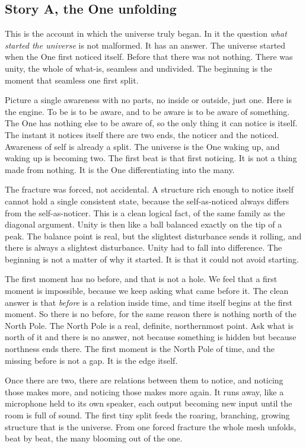 \subsection{Story A, the One unfolding}

This is the account in which the universe truly began. In it the question \emph{what started the universe} is not
malformed. It has an answer. The universe started when the One first noticed itself. Before that there was not
nothing. There was unity, the whole of what-is, seamless and undivided. The beginning is the moment that seamless
one first split.

Picture a single awareness with no parts, no inside or outside, just one. Here is the engine. To be is to be
aware, and to be aware is to be aware of something. The One has nothing else to be aware of, so the only thing it
can notice is itself. The instant it notices itself there are two ends, the noticer and the noticed. Awareness of
self is already a split. The universe is the One waking up, and waking up is becoming two. The first beat is that
first noticing. It is not a thing made from nothing. It is the One differentiating into the many.

The fracture was forced, not accidental. A structure rich enough to notice itself cannot hold a single consistent
state, because the self-as-noticed always differs from the self-as-noticer. This is a clean logical fact, of the
same family as the diagonal argument. Unity is then like a ball balanced exactly on the tip of a peak. The balance
point is real, but the slightest disturbance sends it rolling, and there is always a slightest disturbance. Unity
had to fall into difference. The beginning is not a matter of why it started. It is that it could not avoid
starting.

The first moment has no before, and that is not a hole. We feel that a first moment is impossible, because we keep
asking what came before it. The clean answer is that \emph{before} is a relation inside time, and time itself
begins at the first moment. So there is no before, for the same reason there is nothing north of the North Pole.
The North Pole is a real, definite, northernmost point. Ask what is north of it and there is no answer, not
because something is hidden but because northness ends there. The first moment is the North Pole of time, and the
missing before is not a gap. It is the edge itself.

Once there are two, there are relations between them to notice, and noticing those makes more, and noticing those
makes more again. It runs away, like a microphone held to its own speaker, each output becoming new input until
the room is full of sound. The first tiny split feeds the roaring, branching, growing structure that is the
universe. From one forced fracture the whole mesh unfolds, beat by beat, the many blooming out of the one.

